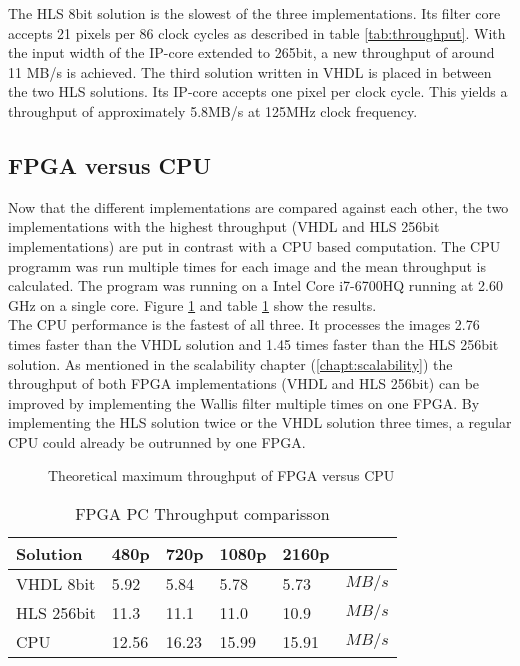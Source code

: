 The HLS 8bit solution is the slowest of the three implementations. Its filter
core accepts 21 pixels per 86 clock cycles as described in table \ref{tab:throughput}. 
With the input width of the IP-core extended to 265bit,
a new throughput of around 11 MB/s is achieved. The third solution written
in VHDL is placed in between the two HLS solutions. Its IP-core accepts one
pixel per clock cycle. This yields a throughput of approximately 5.8MB/s at
125MHz clock frequency.

\clearpage
\subsection{FPGA versus CPU}
Now that the different implementations are compared against each other, the
two implementations with the highest throughput (VHDL and HLS 256bit
implementations) are put in contrast with a CPU based computation.  The CPU
programm was run multiple times for each image and the mean throughput is
calculated. The program was running on a Intel Core i7-6700HQ running at 2.60
GHz on a single core.  Figure \ref{fig:theoreticalmax} and table
\ref{tab:throughputcompare} show the results.
\\

The CPU performance is the fastest of all three. It processes the images 2.76
times faster than the VHDL solution and 1.45 times faster than the HLS 256bit
solution. As mentioned in the scalability chapter (\ref{chapt:scalability}) the
throughput of both FPGA implementations (VHDL and HLS 256bit) can be improved by
implementing the Wallis filter multiple times on one FPGA. By implementing the
HLS solution twice or the VHDL solution three times, a regular CPU could already
be outrunned by one FPGA.

\begin{figure}[b!]
    \centering
    \begin{adjustbox}{max width=\linewidth}
        
    \end{adjustbox}
    \caption{Theoretical maximum throughput of FPGA versus CPU}
    \label{fig:theoreticalmax}
\end{figure}

\begin{table}[b!]
    \centering
    \begin{tabular}{l l l l l l}
        \toprule
        Solution & 480p & 720p & 1080p & 2160p & \\
        \midrule
        VHDL 8bit       & 5.92  & 5.84  & 5.78  & 5.73  & $MB/s$ \\
        HLS  256bit & 11.3  & 11.1  & 11.0  & 10.9  & $MB/s$ \\
        CPU        & 12.56 & 16.23 & 15.99 & 15.91 & $MB/s$ \\
        \bottomrule
    \end{tabular}
    \caption{FPGA PC Throughput comparisson}
    \label{tab:throughputcompare}
\end{table}

